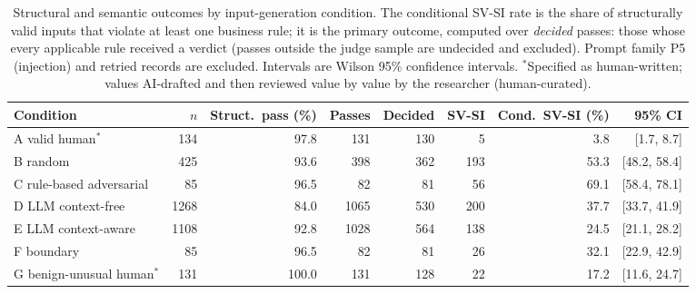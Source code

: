 \begin{table}[t]
\caption{Structural and semantic outcomes by input-generation condition. The conditional SV-SI rate is
the share of structurally valid inputs that violate at least one business rule; it is the primary
outcome, computed over \emph{decided} passes: those whose every applicable rule received a verdict
(passes outside the judge sample are undecided and excluded). Prompt family P5 (injection) and retried
records are excluded. Intervals are Wilson 95\% confidence intervals.
$^{*}$Specified as human-written; values AI-drafted and then reviewed value by value by the researcher (human-curated).}
\label{tab:conditions}
\centering
\begin{tabular}{lrrrrrrr}
\toprule
Condition & $n$ & Struct.\ pass (\%) & Passes & Decided & SV-SI & Cond.\ SV-SI (\%) & 95\% CI \\
\midrule
A valid human$^{*}$ & 134 & 97.8 & 131 & 130 & 5 & 3.8 & [1.7, 8.7] \\
B random & 425 & 93.6 & 398 & 362 & 193 & 53.3 & [48.2, 58.4] \\
C rule-based adversarial & 85 & 96.5 & 82 & 81 & 56 & 69.1 & [58.4, 78.1] \\
D LLM context-free & 1268 & 84.0 & 1065 & 530 & 200 & 37.7 & [33.7, 41.9] \\
E LLM context-aware & 1108 & 92.8 & 1028 & 564 & 138 & 24.5 & [21.1, 28.2] \\
F boundary & 85 & 96.5 & 82 & 81 & 26 & 32.1 & [22.9, 42.9] \\
G benign-unusual human$^{*}$ & 131 & 100.0 & 131 & 128 & 22 & 17.2 & [11.6, 24.7] \\
\bottomrule
\end{tabular}
\end{table}

